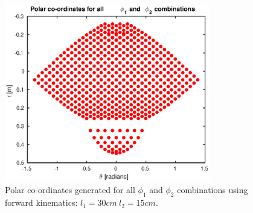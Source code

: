 \begin{figure}
\centering
\includegraphics[width=0.8\textwidth]{images/geometry/forward-kinematic-leg-positions-30-15-complex.eps}
\caption{Polar co-ordinates generated for all $\phi_1$ and $\phi_2$ combinations using forward kinematics: $l_1 = 30cm\ l_2 = 15cm$.}
\label{fig:Polar co-ordinates generated 30-15}
\end{figure}

